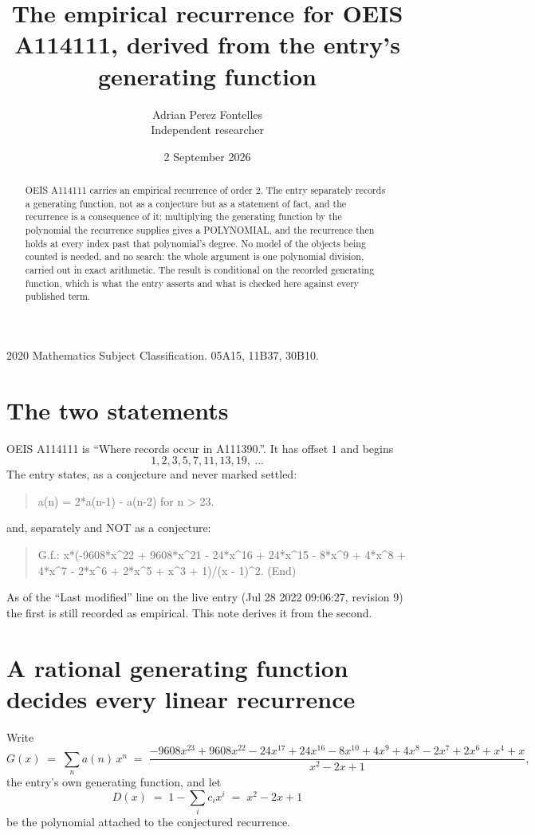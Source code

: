 \documentclass[11pt,a4paper]{article}
\title{The empirical recurrence for OEIS A114111, derived from the entry's generating function}
\author{Adrian Perez Fontelles\\ \small Independent researcher}
\date{2 September 2026}
\theoremstyle{plain}
\theoremstyle{definition}
\begin{document}
\maketitle

\begin{abstract}
OEIS A114111 carries an empirical recurrence of order $2$. The entry separately records a
generating function, not as a conjecture but as a statement of fact, and the recurrence is a
consequence of it: multiplying the generating function by the polynomial the recurrence
supplies gives a POLYNOMIAL, and the recurrence then holds at every index past that
polynomial's degree. No model of the objects being counted is needed, and no search: the
whole argument is one polynomial division, carried out in exact arithmetic. The result is
conditional on the recorded generating function, which is what the entry asserts and what is
checked here against every published term.
\end{abstract}

\noindent\small 2020 Mathematics Subject Classification. 05A15, 11B37, 30B10.\normalsize

\section{The two statements}

OEIS A114111 is ``Where records occur in A111390.''. It has offset $1$ and begins
\[
1, 2, 3, 5, 7, 11, 13, 19,\ \dots
\]
The entry states, as a conjecture and never marked settled:
\begin{quote}
a(n) = 2*a(n-1) - a(n-2) for n > 23.
\end{quote}
and, separately and NOT as a conjecture:
\begin{quote}
G.f.: x*(-9608*x\^{}22 + 9608*x\^{}21 - 24*x\^{}16 + 24*x\^{}15 - 8*x\^{}9 + 4*x\^{}8 + 4*x\^{}7 - 2*x\^{}6 + 2*x\^{}5 + x\^{}3 + 1)/(x - 1)\^{}2. (End)
\end{quote}
As of the ``Last modified'' line on the live entry (Jul 28 2022 09:06:27, revision 9) the first is still
recorded as empirical. This note derives it from the second.

\section{A rational generating function decides every linear recurrence}

Write
\[
G(x)\;=\;\sum_{n}a(n)\,x^{n}\;=\;\frac{- 9608 x^{23} + 9608 x^{22} - 24 x^{17} + 24 x^{16} - 8 x^{10} + 4 x^{9} + 4 x^{8} - 2 x^{7} + 2 x^{6} + x^{4} + x}{x^{2} - 2 x + 1},
\]
the entry's own generating function, and let
\[
D(x)\;=\;1-\sum_i c_i x^{i}\;=\;x^{2} - 2 x + 1
\]
be the polynomial attached to the conjectured recurrence.
\end{document}
